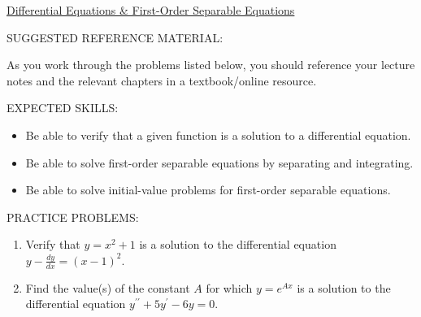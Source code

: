 \documentclass[12pt]{article}
\newif\ifans
\begin{document}
\begin{center}
\underline{\LARGE{Differential Equations \& First-Order Separable Equations}}
\end{center}

\noindent SUGGESTED REFERENCE MATERIAL:

\medskip

\noindent As you work through the problems listed below, you should reference your lecture notes and the relevant chapters in a textbook/online resource.

\bigskip

\noindent EXPECTED SKILLS:

\medskip

\begin{itemize}[topsep=0pt]

\item Be able to verify that a given function is a solution to a differential equation.

\item Be able to solve first-order separable equations by separating and integrating.

\item Be able to solve initial-value problems for first-order separable equations. 

\end{itemize}

\bigskip

\noindent PRACTICE PROBLEMS:

\begin{enumerate}

\item Verify that $y=x^2+1$ is a solution to the differential equation $y-\frac{dy}{dx}=(x-1)^2$.

\ifans{\fbox{\parbox{1\linewidth}{Differentiating $y=x^2+1$ with respect to $x$ yields $y^{\prime}=2x$.  Thus,\\
 $$y-\frac{dy}{dx}=(x^2+1)-(2x)=(x-1)^2$$}}} \fi

\item Find the value(s) of the constant $A$ for which $y=e^{Ax}$ is a solution to the differential equation $y^{\prime\prime}+5y^{\prime}-6y=0$.

\ifans{\fbox{$A=-6$ and $A=1$}} \fi

\end{enumerate}

\end{document}
